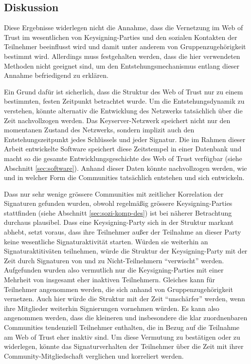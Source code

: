 \subsection{Diskussion}
\label{sec:gesamtb-comm}

Diese Ergebnisse widerlegen nicht die Annahme, dass die Vernetzung im
Web of Trust im wesentlichen von Keysigning-Parties und den sozialen
Kontakten der Teilnehmer beeinflusst wird und damit unter anderem von
Gruppenzugehörigkeit bestimmt wird. Allerdings muss festgehalten
werden, dass die hier verwendeten Methoden nicht geeignet sind, um den
Entstehungsmechanismus entlang dieser Annahme befriedigend zu
erklären. 

Ein Grund dafür ist sicherlich, dass die Struktur des Web of Trust nur
zu einem bestimmten, festen Zeitpunkt betrachtet wurde. Um die
Entstehungsdynamik zu verstehen, könnte alternativ die Entwicklung des
Netzwerks tatsächlich über die Zeit nachvollzogen werden. Das
Keyserver-Netzwerk speichert nicht nur den momentanen Zustand des
Netzwerks, sondern implizit auch den Entstehungszeitpunkt jedes
Schlüssels und jeder Signatur. Die im Rahmen dieser Arbeit entwickelte
Software speichert diese Zeitstempel in einer Datenbank und macht so
die gesamte Entwicklungsgeschichte des Web of Trust verfügbar (siehe
Abschnitt \ref{sec:software}). Anhand dieser Daten könnte
nachvollzogen werden, wie und in welcher Form die Communities
tatsächlich entstehen und sich entwickeln.

Dass nur sehr wenige grössere Communities mit zeitlicher Korrelation
der Signaturen gefunden wurden, obwohl regelmäßig grössere
Keysigning-Parties stattfinden (siehe Abschnitt
\ref{sec:sozi-komp-des}) ist bei näherer Betrachtung durchaus
plausibel. Dass eine Keysigning-Party sich in der Struktur markant
abhebt, setzt voraus, dass ihre Teilnehmer außer der Teilnahme an
dieser Party keine wesentliche Signaturaktivität starten. Würden
sie weiterhin an Signaturaktitiväten teilnehmen, würde die
Struktur der Keysigning-Party mit der Zeit durch Signaturen von und zu
Nicht-Teilnehmern ``verwischt'' werden. Aufgefunden wurden also
vermutlich nur die Keysigning-Parties mit einer Mehrheit von insgesamt
eher inaktiven Teilnehmern. Gleiches kann für Teilnehmer angenommen
werden, die sich anhand von Gruppenzugehörigkeit vernetzen. Auch
hier würde die Struktur mit der Zeit ``unschärfer'' werden, wenn
ihre Mitglieder weiterhin Signierungen vornehmen würden. Es kann
also angenommen werden, dass die kleineren und insbesondere die klar
zuordnenbaren Communities tendenziell Teilnehmer enthalten, die in
Bezug auf die Teilnahme am Web of Trust eher inaktiv sind. Um diese
Vermutung zu bestätigen oder zu widerlegen, könnte das
Signaturverhalten der Teilnehmer über die Zeit mit ihrer
Community-Mitgliedschaft verglichen und korreliert werden.

